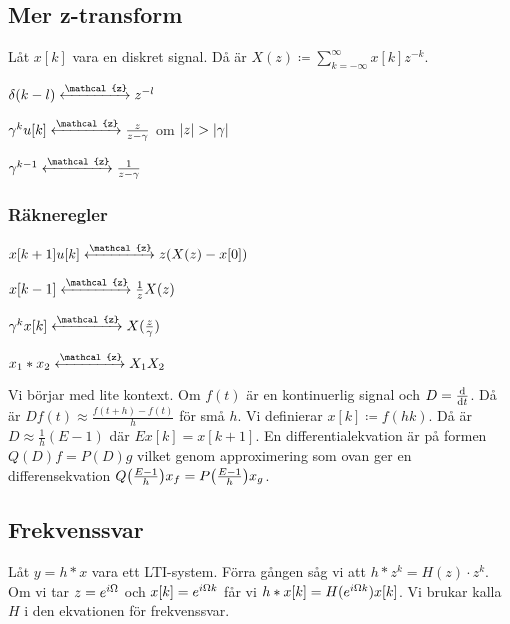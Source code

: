\documentclass[a4paper]{article}
\begin{document}
\providecommand\fname{}
\renewcommand\fname{19-10-10}

\subsection{Mer z-transform}
Låt \(
    x[k]
\) vara en diskret signal. Då är \(
    X(z) \coloneqq \sum_{k=-\infty}^\infty x[k] z^{-k}
\).

\begin{ex}
    \(
        \delta(k-l) \xleftrightarrow{\mathcal{z}} z^{-l}
    \) 
\end{ex}

\begin{ex}
    \(
        \gamma^k u[k] \xleftrightarrow{\mathcal{z}} \frac{z}{z-\gamma} 
    \) om \(
        \abs{z} > \abs{\gamma}
    \) 
\end{ex}

\begin{ex}
    \(
        \gamma^{k-1} \xleftrightarrow{\mathcal{z}} \frac{1}{z-\gamma} 
    \) 
\end{ex}

\subsubsection{Räkneregler}
\(
    x[k+1]u[k] \xleftrightarrow{\mathcal{z}} z (X(z) - x[0])
\) 

\(
    x[k-1] \xleftrightarrow{\mathcal{z}} \inv{z} X(z)
\) 

\(
    \gamma^k x[k] \xleftrightarrow{\mathcal{z}} X(\frac{z}{\gamma})
\) 

\(
    x_1*x_2 \xleftrightarrow{\mathcal{z}} X_1 X_2
\) 

Vi börjar med lite kontext. Om \(
    f(t)
\) är en kontinuerlig signal och \(
    D = \dv{t}
\). Då är \(
    D f(t) \approx \frac{f(t+h) - f(t)}{h} 
\) för små \(
    h
\). Vi definierar \(
    x[k] \coloneqq f(hk)
\). Då är \(
    D \approx \frac{1}{h} (E-1)
\) där \(
    Ex[k] = x[k+1]
\). En differentialekvation är på formen \(
    Q(D)f = P(D)g
\) vilket genom approximering som ovan ger en differensekvation \(
    Q\qty(\frac{E-1}{h} ) x_f = P\qty(\frac{E-1}{h} ) x_g
\).

\subsection{Frekvenssvar}
Låt \(
    y = h*x
\) vara ett LTI-system. Förra gången såg vi att \(
    h * z^k = H(z) \cdot z^k
\). Om vi tar \(
    z = e^{{i\Omega}}
\) och \(
    x[k] = e^{{i\Omega} k}
\) får vi \(
    h * x[k] = H(e^{{i\Omega} k}) x[k]
\). Vi brukar kalla \(
    H
\) i den ekvationen för frekvenssvar.
\end{document}
